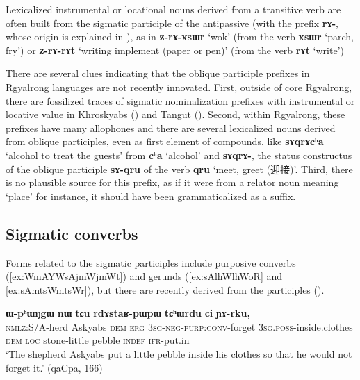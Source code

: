 \documentclass[oneside,a4paper,11pt]{article}
\newcommand{\ipa}[1]{\textbf{{\phon\mbox{#1}}}} %
\newcommand{\zh}[1]{{\cn #1}}
\begin{document}
Lexicalized instrumental or locational nouns derived from a transitive verb are often built from the sigmatic participle of the antipassive (with the prefix \ipa{rɤ-}, whose origin is explained in \citealt{jacques14antipassive}), as in \ipa{z-rɤ-xsɯr} `wok' (from the verb \ipa{xsɯr} `parch, fry') or \ipa{z-rɤ-rɤt} `writing implement (paper or pen)' (from the verb \ipa{rɤt} `write')


There are several clues indicating that the oblique participle prefixes in Rgyalrong languages are not recently innovated. First, outside of core Rgyalrong, there are fossilized traces of sigmatic nominalization prefixes with instrumental or locative value in Khroskyabs (\citealt[511]{lai17khroskyabs}) and Tangut (\citealt[256-257]{jacques14esquisse}). Second, within Rgyalrong, these prefixes have many allophones and there are several lexicalized nouns derived from oblique participles, even as first element of compounds, like \ipa{sɤqrɤcʰa} `alcohol to treat the guests' from \ipa{cʰa} `alcohol' and \ipa{sɤqrɤ-}, the status constructus of the oblique participle \ipa{sɤ-qru} of the verb \ipa{qru} `meet, greet (\zh{迎接})'. Third, there is no plausible source for this prefix, as if it were from a relator noun meaning `place' for instance, it should have been grammaticalized as a suffix.

\subsection{Sigmatic converbs} \label{sec:s.converbs}

Forms related to the sigmatic participles include purposive  converbs (\ref{ex:WmAYWsAjmWjmWt})  and gerunds (\ref{ex:sAlhWlhWoR} and \ref{ex:sAmtsWmtsWr}), but there are recently derived from the participles (\citealt[272-273]{jacques14linking}).

\begin{exe}
\ex \label{ex:WmAYWsAjmWjmWt}
\gll
[\ipa{kɯ-lɤɣ}   	\ipa{acɤβ}   	\ipa{nɯ}   	\ipa{kɯ}   	\ipa{\textbf{ɯ-mɤ-sɤ-jmɯ\textasciitilde{}jmɯt}},]   	\ipa{ɯ-pʰɯŋgɯ}   	\ipa{nɯ}   	\ipa{tɕu}   	\ipa{rdɤstaʁ-pɯpɯ}   	\ipa{tɕʰɯrdu}   	\ipa{ci}  \ipa{ɲɤ-rku,}\\
 \textsc{nmlz}:S/A-herd Askyabs \textsc{dem} \textsc{erg}  \textsc{3sg-neg-purp:conv}-forget \textsc{3sg.poss}-inside.clothes \textsc{dem} \textsc{loc} stone-little pebble \textsc{indef}
 \textsc{ifr}-put.in\\
\glt `The shepherd Askyabs put a little pebble inside his clothes so that he would not forget it.' (qaCpa, 166)
\end{exe}
\end{document}
